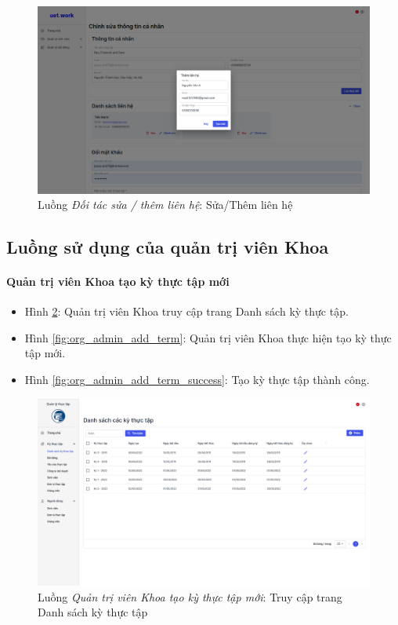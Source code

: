 \documentclass[./../main.tex]{subfiles}
\begin{document}
\begin{figure}[]
	\includegraphics[width=\linewidth]{./images/image48.png}
	\caption{Luồng \emph{Đối tác sửa / thêm liên hệ}: Sửa/Thêm liên hệ}
	\label{fig:partner_upsert_contact}
\end{figure}

\subsection{Luồng sử dụng của quản trị viên Khoa}

\paragraph*{Quản trị viên Khoa tạo kỳ thực tập mới}

\begin{itemize}
	\item Hình \ref{fig:org_admin_access_list_terms}: Quản trị viên Khoa truy cập trang Danh sách kỳ thực tập. 
	\item Hình \ref{fig:org_admin_add_term}: Quản trị viên Khoa thực hiện tạo kỳ thực tập mới.
	\item Hình \ref{fig:org_admin_add_term_success}: Tạo kỳ thực tập thành công.
\end{itemize}

\begin{figure}[]
	\includegraphics[width=\linewidth]{./images/image53.png}
	\caption{Luồng \emph{Quản trị viên Khoa tạo kỳ thực tập mới}: Truy cập trang Danh sách kỳ thực tập}
	\label{fig:org_admin_access_list_terms}
\end{figure}
\end{document}
